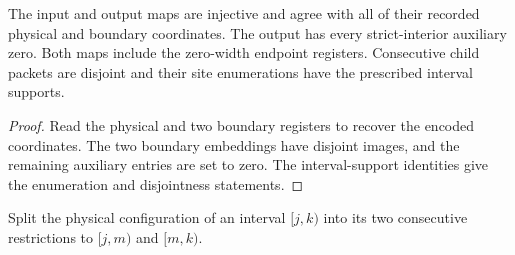 \begin{lemma}
    \label{thm:mpu_interval_column_encoding}
    \leanok
    The input and output maps are injective and agree with all of
    their recorded physical and boundary coordinates. The output
    has every strict-interior auxiliary zero. Both maps
    include the zero-width endpoint registers. Consecutive child
    packets are disjoint and their site enumerations have
    the prescribed interval supports.
\end{lemma}
\begin{proof}\leanok
    Read the physical and two boundary registers to recover the
    encoded coordinates. The two boundary embeddings have disjoint
    images, and the remaining auxiliary entries are set to zero.
    The interval-support identities give the enumeration and
    disjointness statements.
\end{proof}

\begin{definition}
    \label{def:mpu_actual_parent_split}
    \leanok
    Split the physical configuration of an interval $[j,k)$ into
    its two consecutive restrictions to $\lbrack j,m)$ and $\lbrack m,k)$.
\end{definition}

